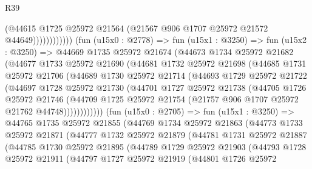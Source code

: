 \begin{lexlean}{R39}
\begin{coremodule}
                            (@44615
                              @1725
                              @25972
                              @21564
                              (@21567 @906 @1707 @25972 @21572 @44649))))))))))))
        (fun (u15x0 : @2778) =>
        fun (u15x1 : @3250) =>
        fun (u15x2 : @3250) =>
        @44669
          @1735
          @25972
          @21674
          (@44673
            @1734
            @25972
            @21682
            (@44677
              @1733
              @25972
              @21690
              (@44681
                @1732
                @25972
                @21698
                (@44685
                  @1731
                  @25972
                  @21706
                  (@44689
                    @1730
                    @25972
                    @21714
                    (@44693
                      @1729
                      @25972
                      @21722
                      (@44697
                        @1728
                        @25972
                        @21730
                        (@44701
                          @1727
                          @25972
                          @21738
                          (@44705
                            @1726
                            @25972
                            @21746
                            (@44709
                              @1725
                              @25972
                              @21754
                              (@21757 @906 @1707 @25972 @21762 @44748))))))))))))
        (fun (u15x0 : @2705) =>
        fun (u15x1 : @3250) =>
        @44765
          @1735
          @25972
          @21855
          (@44769
            @1734
            @25972
            @21863
            (@44773
              @1733
              @25972
              @21871
              (@44777
                @1732
                @25972
                @21879
                (@44781
                  @1731
                  @25972
                  @21887
                  (@44785
                    @1730
                    @25972
                    @21895
                    (@44789
                      @1729
                      @25972
                      @21903
                      (@44793
                        @1728
                        @25972
                        @21911
                        (@44797
                          @1727
                          @25972
                          @21919
                          (@44801
                            @1726
                            @25972

\end{coremodule}
\end{lexlean}
